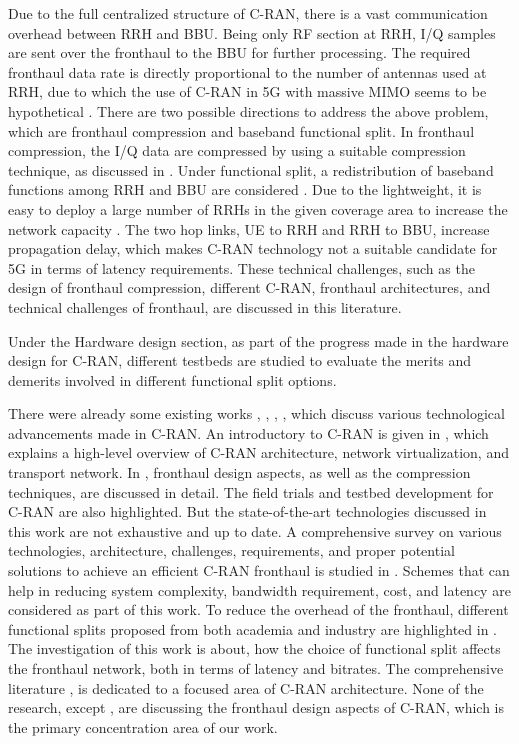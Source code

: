 \begin{multicols}{2}
Due to the full centralized structure of C-RAN, there is a vast communication overhead between RRH and BBU. Being only RF section at RRH, I/Q samples are sent over the fronthaul to the BBU for further processing. The required fronthaul data rate is directly proportional to the number of antennas used at RRH, due to which the use of C-RAN in 5G with massive MIMO seems to be hypothetical \cite{art3-key09}. There are two possible directions to address the above problem, which are fronthaul compression and baseband functional split. In fronthaul compression, the I/Q data are compressed by using a suitable compression technique, as discussed in \cite{art3-key10}. Under functional split, a redistribution of baseband functions among RRH and BBU are considered \cite{art3-key11}. Due to the lightweight, it is easy to deploy a large number of RRHs in the given coverage area to increase the network capacity \cite{art3-key05}. The two hop links, UE to RRH and RRH to BBU, increase propagation delay, which makes C-RAN technology not a suitable candidate for 5G in terms of latency requirements. These technical challenges, such as the design of fronthaul compression, different C-RAN, fronthaul architectures, and technical challenges of fronthaul, are discussed in this literature.

Under the Hardware design section, as part of the progress made in the hardware design for C-RAN, different testbeds are studied to evaluate the merits and demerits involved in different functional split options.

There were already some existing works \cite{art3-key05}, \cite{art3-key07}, \cite{art3-key11}, \cite{art3-key12}, which discuss various technological advancements made in C-RAN. An introductory to C-RAN is given in \cite{art3-key05}, which explains a high-level overview of C-RAN architecture, network virtualization, and transport network. In \cite{art3-key07}, fronthaul design aspects, as well as the compression techniques, are discussed in detail. The field trials and testbed development for C-RAN are also highlighted. But the state-of-the-art technologies discussed in this work are not exhaustive and up to date. A comprehensive survey on various technologies, architecture, challenges, requirements, and proper potential solutions to achieve an efficient C-RAN fronthaul is studied in \cite{art3-key12}. Schemes that can help in reducing system complexity, bandwidth requirement, cost, and latency are considered as part of this work. To reduce the overhead of the fronthaul, different functional splits proposed from both academia and industry are highlighted in \cite{art3-key11}. The investigation of this work is about, how the choice of functional split affects the fronthaul network, both in terms of latency and bitrates. The comprehensive literature \cite{art3-key11}, \cite{art3-key12} is dedicated to a focused area of C-RAN architecture. None of the research, except \cite{art3-key07}, are discussing the fronthaul design aspects of C-RAN, which is the primary concentration area of our work.


\end{multicols}
